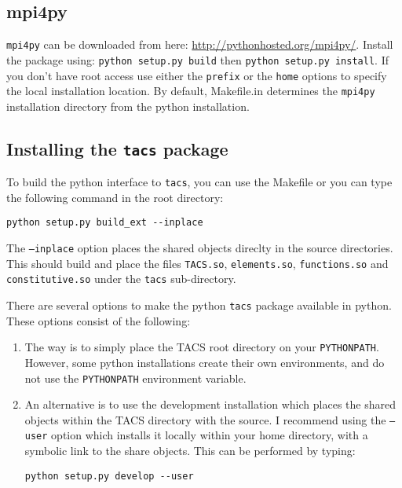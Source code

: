 \documentclass{article}
\begin{document}
\subsection{mpi4py}
 
\texttt{mpi4py} can be downloaded from here:
\url{http://pythonhosted.org/mpi4py/}.  Install the package using:
\texttt{python setup.py build} then \texttt{python setup.py
  install}. If you don't have root access use either the
\texttt{prefix} or the \texttt{home} options to specify the local
installation location. By default, Makefile.in determines the 
\texttt{mpi4py} installation directory from the python
installation.

\subsection{Installing the \texttt{tacs} package}

To build the python interface to \texttt{tacs}, you can use the Makefile
or you can type the following command in the root directory:

\begin{verbatim}
python setup.py build_ext --inplace
\end{verbatim}

The \texttt{--inplace} option places the shared objects direclty in the source
directories.  This should build and place the files \texttt{TACS.so}, 
\texttt{elements.so}, \texttt{functions.so} and \texttt{constitutive.so} under the 
\texttt{tacs} sub-directory.

There are several options to make the python \texttt{tacs} package
available in python. These options consist of the following:

\begin{enumerate}
\item The way is to simply place the TACS root directory
on your \texttt{PYTHONPATH}. However, some python installations create their 
own environments, and do not use the \texttt{PYTHONPATH} environment variable.

\item An alternative is to use the development installation which
places the shared objects within the TACS directory with the source.
I recommend using the \texttt{--user} option which installs it locally
within your home directory, with a symbolic link to the share objects.
This can be performed by typing:

\begin{verbatim}
python setup.py develop --user
\end{verbatim}

\end{enumerate}
\end{document}
